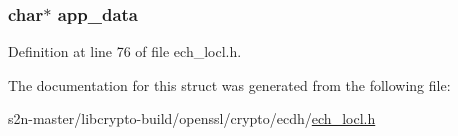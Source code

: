 \subsubsection[{\texorpdfstring{app\+\_\+data}{app_data}}]{\setlength{\rightskip}{0pt plus 5cm}char$\ast$ app\+\_\+data}\hypertarget{structecdh__method_ae2a89f832bf7b6b967e9c3d590e65f83}{}\label{structecdh__method_ae2a89f832bf7b6b967e9c3d590e65f83}


Definition at line 76 of file ech\+\_\+locl.\+h.



The documentation for this struct was generated from the following file\+:\begin{DoxyCompactItemize}
\item 
s2n-\/master/libcrypto-\/build/openssl/crypto/ecdh/\hyperlink{ech__locl_8h}{ech\+\_\+locl.\+h}\end{DoxyCompactItemize}
